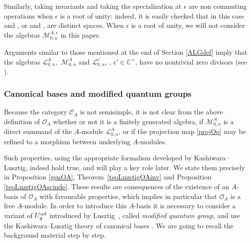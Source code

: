 \documentclass[11pt]{article}
\numberwithin{equation}{section}
\numberwithin{equation}{section}
\theoremstyle{definition}
\newcommand{\e}{\epsilon}
\newcommand{\ep}{{\epsilon'}}
\newcommand{\mc}{\mathbb{C}}
\newcommand{\Ll}{{\mathcal L}}
\newcommand{\Mm}{{\mathcal M}}
\newcommand{\Oo}{{\mathcal O}}
\begin{document}
Similarly, taking invariants and taking the specialization at $\e$ are non commuting operations when $\e$ is a root of unity: indeed, it is easily checked that in this case \smash{$\big(U_A^{\otimes n}\big)^{U_A}_\e$} and \smash{$\big(U_\e^{\otimes n}\big)^{U_\e}$}, or \smash{$\Mm_{0,n}^{A,\e} = \Mm_{0,n}^A \bigotimes_A \mc_\e$} and \smash{$\big(\Ll_{0,n}^\e\big)^{U_\e}$}, are distinct spaces. When $\e$ is a root of unity, we will not consider the algebras $\Mm_{0,n}^{A,\e}$ in this paper.

Arguments similar to those mentioned at the end of Section \ref{ALGdef} imply that the algebras $\Ll_{0,n}^A$,~$\Mm_{0,n}^A$ and $\Ll_{0,n}^\ep$, \smash{$\Mm_{0,n}^{A,\ep}$}, $\ep\in \mc^\times$, have no nontrivial zero divisors (see \cite[Propositions~6.11 and~6.30]{BR}).

\subsubsection{Canonical bases and modified quantum groups} \label{canbasemodqg} Because the category $\mathcal{C}_A$ is not semisimple, it is not clear from the above definition of $\Oo_A$ whether or not it is a finitely generated algebra, if $\Mm_{0,n}^A$ is a direct summand of the $A$-module $\Ll_{0,n}^A$, or if the projection map \eqref{projOq} may be refined to a morphism between underlying $A$-modules.

Such properties, using the appropriate formalism developed by Kashiwara--Lusztig, indeed hold true, and will play a key role later. We state them precisely in Proposition \ref{genOA}, Theorem~\ref{teoLuzstigOAinv} and Proposition \ref{teoLuzstigOAscinde}. These results are consequences of the existence of an $A$-basis of $\Oo_A$ with favourable properties, which implies in particular that $\Oo_A$ is a free $A$-module. In order to introduce this $A$-basis it is necessary to consider a variant of $U_q^{\rm ad}$ introduced by Lusztig~\cite{Lusztig}, called {\it modified quantum group}, and use the Kashiwara--Lusztig theory of canonical bases \cite{Kashiwara1,Kashiwara2,Kashiwara3,Lusztig}. We are going to recall the background material step by step.
\end{document}
